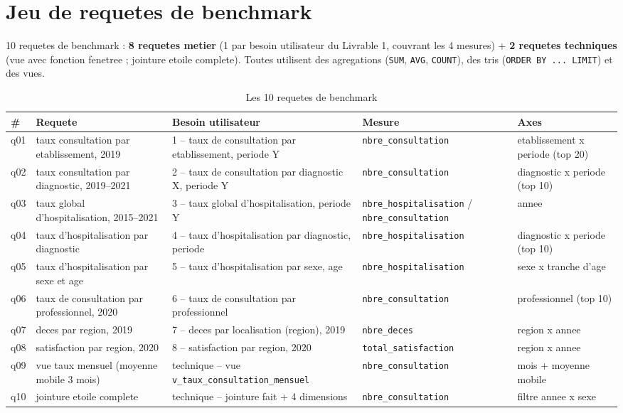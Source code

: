 \documentclass[11pt,a4paper]{article}
\begin{document}
\section{Jeu de requetes de benchmark}

10 requetes de benchmark : \textbf{8 requetes metier} (1 par besoin utilisateur
du Livrable 1, couvrant les 4 mesures) + \textbf{2 requetes techniques} (vue avec
fonction fenetree ; jointure etoile complete). Toutes utilisent des agregations
(\texttt{SUM}, \texttt{AVG}, \texttt{COUNT}), des tris (\texttt{ORDER BY ... LIMIT})
et des vues.

\begin{table}[H]\centering\small
\caption{Les 10 requetes de benchmark}
\setlength{\tabcolsep}{4pt}\begin{tabular}{p{0.8cm}p{1.8cm}p{5.0cm}p{3.8cm}p{3.1cm}}
\toprule
\textbf{\#} & \textbf{Requete} & \textbf{Besoin utilisateur} & \textbf{Mesure} & \textbf{Axes} \\
\midrule
q01 & taux consultation par etablissement, 2019 & 1 -- taux de consultation par etablissement, periode Y & \texttt{nbre\_consultation} & etablissement x periode (top 20) \\
q02 & taux consultation par diagnostic, 2019--2021 & 2 -- taux de consultation par diagnostic X, periode Y & \texttt{nbre\_consultation} & diagnostic x periode (top 10) \\
q03 & taux global d'hospitalisation, 2015--2021 & 3 -- taux global d'hospitalisation, periode Y & \texttt{nbre\_hospitalisation} / \texttt{nbre\_consultation} & annee \\
q04 & taux d'hospitalisation par diagnostic & 4 -- taux d'hospitalisation par diagnostic, periode & \texttt{nbre\_hospitalisation} & diagnostic x periode (top 10) \\
q05 & taux d'hospitalisation par sexe et age & 5 -- taux d'hospitalisation par sexe, age & \texttt{nbre\_hospitalisation} & sexe x tranche d'age \\
q06 & taux de consultation par professionnel, 2020 & 6 -- taux de consultation par professionnel & \texttt{nbre\_consultation} & professionnel (top 10) \\
q07 & deces par region, 2019 & 7 -- deces par localisation (region), 2019 & \texttt{nbre\_deces} & region x annee \\
q08 & satisfaction par region, 2020 & 8 -- satisfaction par region, 2020 & \texttt{total\_satisfaction} & region x annee \\
q09 & vue taux mensuel (moyenne mobile 3 mois) & technique -- vue \texttt{v\_taux\_consultation\_mensuel} & \texttt{nbre\_consultation} & mois + moyenne mobile \\
q10 & jointure etoile complete & technique -- jointure fait + 4 dimensions & \texttt{nbre\_consultation} & filtre annee x sexe \\
\bottomrule
\end{tabular}
\end{table}
\end{document}
